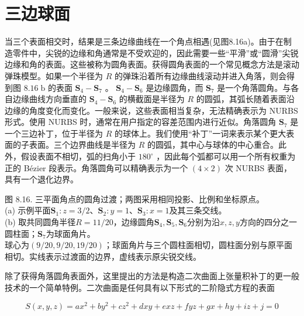 \documentclass[../main.tex]{subfiles}
\begin{document}
\section{三边球面}
当三个表面相交时，结果是三条边缘曲线在一个角点相遇(见图8.16a)。由于在制造零件中，尖锐的边缘和角通常是不受欢迎的，因此需要一些“平滑”或“圆滑”尖锐边缘和角的表面。这些被称为圆角表面。获得圆角表面的一个常见概念方法是滚动弹珠模型。如果一个半径为 \(R\) 的弹珠沿着所有边缘曲线滚动并进入角落，则会得到图 \({8.16}\mathrm{\;b}\) 的表面 \({\mathbf{S}}_{4} - {\mathbf{S}}_{7}\) 。 \({\mathbf{S}}_{4} - {\mathbf{S}}_{6}\) 是边缘圆角，而 \({\mathbf{S}}_{7}\) 是一个角落圆角。与各自边缘曲线方向垂直的 \({\mathbf{S}}_{4} - {\mathbf{S}}_{6}\) 的横截面是半径为 \(R\) 的圆弧，其弧长随着表面沿边缘的角度变化而变化。一般来说，这些表面相当复杂，无法精确表示为 NURBS 形式。使用 NURBS 时，通常在用户指定的容差范围内进行近似。角落圆角 \({\mathbf{S}}_{7}\) 是一个三边补丁，位于半径为 \(R\) 的球体上。我们使用“补丁”一词来表示某个更大表面的子表面。三个边界曲线是半径为 \(R\) 的圆弧，其中心与球体的中心重合。此外，假设表面不相切，弧的扫角小于 \({180}^{ \circ  }\) ，因此每个弧都可以用一个所有权重为正的 Bézier 段表示。角落圆角可以精确表示为一个 \(\left( {4 \times  2}\right)\) 次 NURBS 表面，具有一个退化边界。

\begin{center}
\begin{minipage}{27cm}
\vspace*{.6\baselineskip}
\centering
{}
\par\smallskip
图 8.16. 三平面角点的圆角过渡；两图采用相同投影、比例和坐标原点。\\
(a) 示例平面$\mathbf S_1:z=3/2$、$\mathbf S_2:y=1$、$\mathbf S_3:x=1$及其三条交线。\\
(b) 取共同圆角半径$R=11/20$，边缘圆角$\mathbf S_4,\mathbf S_5,\mathbf S_6$分别为沿$x,z,y$方向的四分之一圆柱面；$\mathbf S_7$为球面角片。\\
球心为$(9/20,9/20,19/20)$；球面角片与三个圆柱面相切，圆柱面分别与原平面相切。实线表示过渡面的边界，虚线表示原尖锐交线。
\end{minipage}
\end{center}

除了获得角落圆角表面外，这里提出的方法是构造二次曲面上张量积补丁的更一般技术的一个简单特例。二次曲面是任何具有以下形式的二阶隐式方程的表面

\[
S\left( {x,y,z}\right)  = a{x}^{2} + b{y}^{2} + c{z}^{2} + {dxy} + {exz} + {fyz} + {gx} + {hy} + {iz} + j = 0 \tag{8.12}
\]
\end{document}
